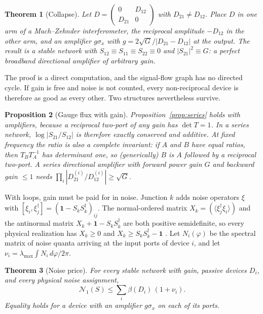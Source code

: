 \documentclass[aps,pra,twocolumn,superscriptaddress,floatfix,nofootinbib]{revtex4-2}
\newtheorem{theorem}{Theorem}
\newtheorem{proposition}[theorem]{Proposition}
\theoremstyle{definition}
\newcommand{\NN}{\mathcal N_1}
\newcommand{\D}{\mathbb D}
\newcommand{\one}{\mathbf 1}
\begin{document}
\begin{theorem}[Collapse]\label{thm:collapse}
Let $D=\left(\begin{smallmatrix}0&D_{12}\\D_{21}&0\end{smallmatrix}\right)$ with $D_{21}\neq D_{12}$. Place $D$ in one arm of a Mach--Zehnder interferometer, the reciprocal amplitude $-D_{12}$ in the other arm, and an amplifier $g\sigma_x$ with $g=2\sqrt G/|D_{21}-D_{12}|$ at the output. The result is a stable network with $S_{12}\equiv S_{11}\equiv S_{22}\equiv0$ and $|S_{21}|^2\equiv G$: a perfect broadband directional amplifier of arbitrary gain.
\end{theorem}

The proof is a direct computation, and the signal-flow graph has no directed cycle. If gain is free and noise is not counted, every non-reciprocal device is therefore as good as every other. Two structures nevertheless survive.

\begin{proposition}[Gauge flux with gain]\label{prop:seriesgain}
Proposition~\ref{prop:series} holds with amplifiers, because a reciprocal two-port of any gain has $\det T=1$. In a series network, $\log|S_{21}/S_{12}|$ is therefore exactly conserved and additive. At fixed frequency the ratio is also a complete invariant: if $A$ and $B$ have equal ratios, then $T_BT_A^{-1}$ has determinant one, so (generically) $B$ is $A$ followed by a reciprocal two-port. A series directional amplifier with forward power gain $G$ and backward gain $\le1$ needs $\prod_i|D^{(i)}_{21}/D^{(i)}_{12}|\ge\sqrt G$.
\end{proposition}

With loops, gain must be paid for in noise. Junction $k$ adds noise operators $\xi$ with $[\xi_i,\xi_j^\dagger]=(\one-S_kS_k^\dagger)_{ij}$. The normal-ordered matrix $X_k=(\langle\xi_j^\dagger\xi_i\rangle)$ and the antinormal matrix $X_k+\one-S_kS_k^\dagger$ are both positive semidefinite, so every physical realization has $X_k\ge0$ and $X_k\ge S_kS_k^\dagger-\one$ \cite{Cav82,Cle10}. Let $N_i(\varphi)$ be the spectral matrix of noise quanta arriving at the input ports of device $i$, and let $\nu_i=\lambda_{\max}\int N_i\,d\varphi/2\pi$.

\begin{theorem}[Noise price]\label{thm:noise}
For every stable network with gain, passive devices $D_i$, and every physical noise assignment,
\begin{equation}
\NN(S)\le\sum_i\beta(D_i)\,(1+\nu_i).
\end{equation}
Equality holds for a device with an amplifier $g\sigma_x$ on each of its ports.
\end{theorem}
\end{document}

